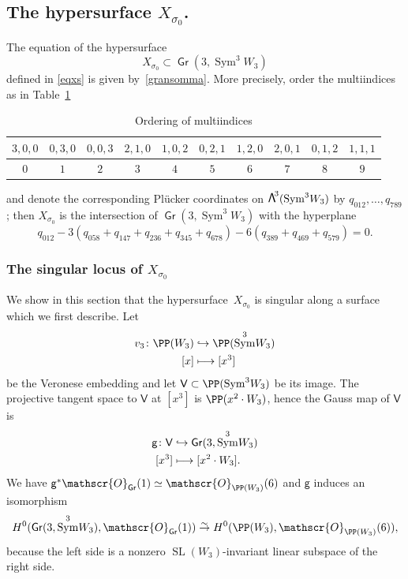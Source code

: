 \documentclass[JEP,XML,SOM,Unicode, NoEqCountersInSection,NoFloatCountersInSection]{cedram}
\let\mathcal\mathscr
\newcommand\mto{\mathchoice{\longmapsto}{\mapsto}{\mapsto}{\mapsto}}
\newcommand\hto{\mathrel{\lhook\joinrel\to}}
\newcommand{\isomlra}{\stackrel{{}_{\scriptstyle\sim}}{\to}}
\theoremstyle{definition}
\newcommand\cO{\mathcal{O}}\let\OO\cO
\newcommand\sfV{\mathsf{V}}
\DeclareMathOperator{\Gr}{\mathsf{Gr}}
\let\cong\simeq
\DeclareMathOperator{\Sym}{Sym}
\DeclareMathOperator{\SL}{SL}
\newcommand\bw[1]{{\hbox{\large$\mathsf{\Lambda}$}^{\!#1}}}
\begin{document}
\subsection{The hypersurface $X_{\sigma_0}$.}\label{effezero}

The equation of the hypersurface
\[
X_{\sigma_0}\subset \Gr(3,\Sym^3\! W_{3})
\]
defined in \eqref{eqxs} is given by~\eqref{gransomma}. More precisely, order the multiindices as in
Table~\ref{enumero}
\begin{table}[htb!]
\renewcommand\arraystretch{1.5}
\begin{tabular}{| c | c | c | c | c | c | c | c | c | c |}
\hline
$ 3,0,0$ & $ 0,3,0$ & $ 0,0,3$ & $ 2,1,0$ & $ 1,0,2$ & $ 0,2,1$ & $ 1,2,0$ &
$ 2,0,1$ & $ 0,1,2$ & $ 1,1,1$ \\
\hline
$ 0$ & $ 1$ & $ 2$ & $ 3$ & $ 4$ & $ 5$ & $ 6$ & $ 7$ &
$ 8$ & $ 9$ \\
\hline
\end{tabular}
\vspace{\baselineskip}
\caption{Ordering of multiindices}\label{enumero}
\vspace{-\baselineskip}
\end{table}
and denote the corresponding Plücker coordinates on $\bw3(\Sym^3\! W_{3})$ by $q_{012},\ldots,q_{789}$; then $X_{\sigma_0}$ is the intersection of $\Gr(3,\Sym^3\! W_{3})$ with the hyperplane
\begin{equation}\label{tagliograss}
q_{012}- 3 (q_{058}+q_{147}+ q_{236}+q_{345}+q_{678})-6(q_{389}+q_{469}+q_{579})=0.
\end{equation}

\subsubsection{The singular locus of $X_{\sigma_0}$}

We show in this section that the hypersurface~$X_{\sigma_0}$ is singular along a surface which we first describe. Let
\begin{align*}
v_3\colon\PP(W_3) & \hto \PP(\Sym^3\! W_3) \\
{[}x] & \mto [x^3]
\end{align*}
be the Veronese embedding and let $\sfV\subset\PP(\Sym^3\! W_3)$ be its image. The projective tangent space to $\sfV$ at $[x^3]$
is $\PP(x^2\cdot W_3)$, hence the Gauss map of $\sfV$ is
\begin{equation}
\begin{split}\label{mappagauss}
{\mathsf g}\colon \sfV & \hto \Gr(3,\Sym^3\! W_3) \\
{[}x^3] & \mto [x^2\cdot W_3].
\end{split}
\end{equation}
We have ${\mathsf g}^{*}\cO_{\Gr}(1)\cong \cO_{\PP(W_3)}(6)$ and ${\mathsf g}$ induces an isomorphism
\begin{equation}\label{isomo}
H^0(\Gr(3,\Sym^3\! W_3),\cO_{\Gr}(1))\isomlra H^0(\PP(W_3),\cO_{\PP(W_3)}(6)),
\end{equation}
because the left side
is a nonzero $\SL(W_3)$-invariant linear subspace of the right side.
\end{document}
